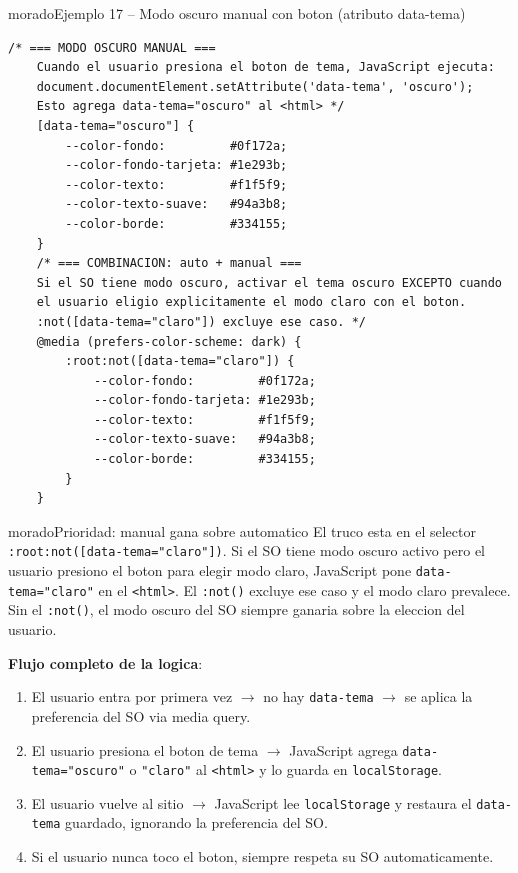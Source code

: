 \documentclass[11pt,a4paper]{article}
\begin{document}
	\begin{cajacodigo}{morado}{Ejemplo 17 -- Modo oscuro manual con boton (atributo data-tema)}
		\begin{lstlisting}[style=codecss]
	/* === MODO OSCURO MANUAL ===
	Cuando el usuario presiona el boton de tema, JavaScript ejecuta:
	document.documentElement.setAttribute('data-tema', 'oscuro');
	Esto agrega data-tema="oscuro" al <html> */
	[data-tema="oscuro"] {
		--color-fondo:         #0f172a;
		--color-fondo-tarjeta: #1e293b;
		--color-texto:         #f1f5f9;
		--color-texto-suave:   #94a3b8;
		--color-borde:         #334155;
	}
	/* === COMBINACION: auto + manual ===
	Si el SO tiene modo oscuro, activar el tema oscuro EXCEPTO cuando
	el usuario eligio explicitamente el modo claro con el boton.
	:not([data-tema="claro"]) excluye ese caso. */
	@media (prefers-color-scheme: dark) {
		:root:not([data-tema="claro"]) {
			--color-fondo:         #0f172a;
			--color-fondo-tarjeta: #1e293b;
			--color-texto:         #f1f5f9;
			--color-texto-suave:   #94a3b8;
			--color-borde:         #334155;
		}
	} \end{lstlisting}
	\end{cajacodigo}
	
	\begin{cajatip}{morado}{Prioridad: manual gana sobre automatico}
		El truco esta en el selector \texttt{:root:not([data-tema="claro"])}. Si el SO tiene modo oscuro activo pero el usuario presiono el boton para elegir modo claro, JavaScript pone \texttt{data-tema="claro"} en el \texttt{<html>}. El \texttt{:not()} excluye ese caso y el modo claro prevalece. Sin el \texttt{:not()}, el modo oscuro del SO siempre ganaria sobre la eleccion del usuario.
		
		\textbf{Flujo completo de la logica}:
		\begin{enumerate}[leftmargin=1.5em,itemsep=2pt]
			\item El usuario entra por primera vez $\to$ no hay \texttt{data-tema} $\to$ se aplica la preferencia del SO via media query.
			\item El usuario presiona el boton de tema $\to$ JavaScript agrega \texttt{data-tema="oscuro"} o \texttt{"claro"} al \texttt{<html>} y lo guarda en \texttt{localStorage}.
			\item El usuario vuelve al sitio $\to$ JavaScript lee \texttt{localStorage} y restaura el \texttt{data-tema} guardado, ignorando la preferencia del SO.
			\item Si el usuario nunca toco el boton, siempre respeta su SO automaticamente.
		\end{enumerate}
	\end{cajatip}
	
\end{document}
